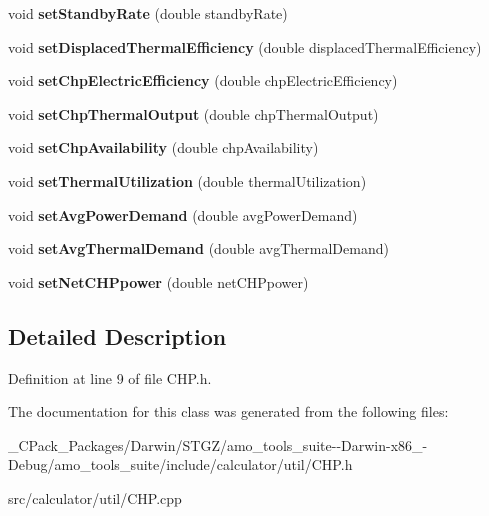 \begin{DoxyCompactItemize}
\item 
\mbox{\label{class_c_h_p_ac25d489d5d3e336f7286c0124f81d3c5}} 
void {\bfseries set\+Standby\+Rate} (double standby\+Rate)
\item 
\mbox{\label{class_c_h_p_a6f80ede27800dfdeb0493e0501823fde}} 
void {\bfseries set\+Displaced\+Thermal\+Efficiency} (double displaced\+Thermal\+Efficiency)
\item 
\mbox{\label{class_c_h_p_a63de982e8324e669ea8a6712a30a6ce4}} 
void {\bfseries set\+Chp\+Electric\+Efficiency} (double chp\+Electric\+Efficiency)
\item 
\mbox{\label{class_c_h_p_a4b132e4e600df80fa87c0e7b680733b7}} 
void {\bfseries set\+Chp\+Thermal\+Output} (double chp\+Thermal\+Output)
\item 
\mbox{\label{class_c_h_p_a0dc3c1f0e0b67564a56b5863c1abf974}} 
void {\bfseries set\+Chp\+Availability} (double chp\+Availability)
\item 
\mbox{\label{class_c_h_p_a8917dfa8b8a68244d0ffe3fd3ca1d13f}} 
void {\bfseries set\+Thermal\+Utilization} (double thermal\+Utilization)
\item 
\mbox{\label{class_c_h_p_a4f3183df776744f6871fb59b07553d2c}} 
void {\bfseries set\+Avg\+Power\+Demand} (double avg\+Power\+Demand)
\item 
\mbox{\label{class_c_h_p_a0036fd3fc3154adc0fdba0ede8277bee}} 
void {\bfseries set\+Avg\+Thermal\+Demand} (double avg\+Thermal\+Demand)
\item 
\mbox{\label{class_c_h_p_a625efb308ccd22c8bdf75f082ff7bae2}} 
void {\bfseries set\+Net\+C\+H\+Ppower} (double net\+C\+H\+Ppower)
\end{DoxyCompactItemize}


\subsection{Detailed Description}


Definition at line 9 of file C\+H\+P.\+h.



The documentation for this class was generated from the following files\+:\begin{DoxyCompactItemize}
\item 
\+\_\+\+C\+Pack\+\_\+\+Packages/\+Darwin/\+S\+T\+G\+Z/amo\+\_\+tools\+\_\+suite-\/-\/\+Darwin-\/x86\+\_-\/\+Debug/amo\+\_\+tools\+\_\+suite/include/calculator/util/C\+H\+P.\+h\item 
src/calculator/util/C\+H\+P.\+cpp\end{DoxyCompactItemize}
